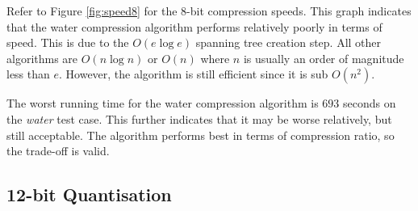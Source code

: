 \documentclass[a4paper]{report}
\begin{document}
Refer to Figure \ref{fig:speed8} for the $8$-bit compression speeds. This
graph indicates that the water compression algorithm performs relatively
poorly in terms of speed. This is due to the $O(e \log e)$ spanning tree
creation step. All other algorithms are $O(n \log n)$ or $O(n)$ where $n$ is
usually an order of magnitude less than $e$. However, the algorithm is still
efficient since it is sub $O(n^2)$.

The worst running time for the water compression algorithm is $693$ seconds on
the \emph{water} test case. This further indicates that it may be worse
relatively, but still acceptable. The algorithm performs best in terms of
compression ratio, so the trade-off is valid.


\subsection{12-bit Quantisation}
\end{document}
